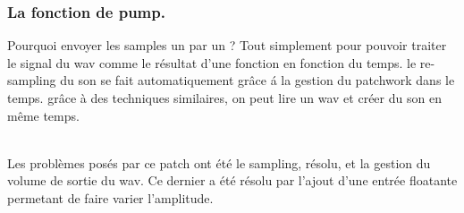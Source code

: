 \subsubsection{La fonction de \textbf{pump}.}
\par
Pourquoi envoyer les samples un par un ? Tout simplement pour pouvoir traiter le signal du
wav comme le r\'esultat d'une fonction en fonction du temps. le re-sampling du son se fait
automatiquement gr\^ace \'a la gestion du patchwork dans le temps. gr\^ace \`a des techniques
similaires, on peut lire un wav et cr\'eer du son en m\^eme temps.
\\
\\
\par
Les probl\`emes pos\'es par ce patch ont \'et\'e le sampling, r\'esolu, et la gestion du volume de
sortie du wav. Ce dernier a \'et\'e r\'esolu par l'ajout d'une entr\'ee floatante permetant de
faire varier l'amplitude.

\newpage
